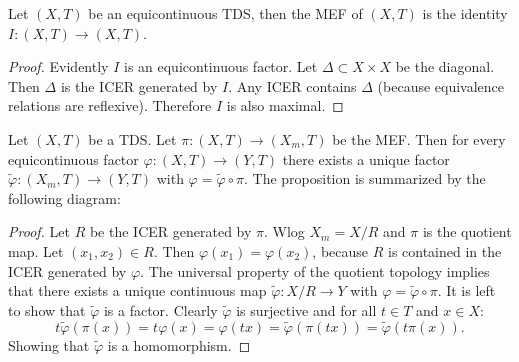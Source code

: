 \begin{proposition}
  Let $(X,T)$ be an equicontinuous TDS, then the MEF of $(X,T)$ is the identity $I: (X,T) \to (X,T)$.
\end{proposition}
\begin{proof}
  Evidently $I$ is an equicontinuous factor.
  Let $\Delta \subset X \times X$ be the diagonal. Then $\Delta$ is the ICER generated by $I$.
  Any ICER contains $\Delta$ (because equivalence relations are reflexive).
  Therefore $I$ is also maximal.
\end{proof}


\begin{proposition}
  Let $(X,T)$ be a TDS. Let $\pi : (X, T) \to  (X_m,T)$ be the MEF.
  Then for every equicontinuous factor $\varphi : (X,T) \to (Y,T)$ there exists a unique factor $\tilde{\varphi}: (X_m,T) \to (Y,T)$ with $\varphi = \tilde{\varphi} \circ \pi$.
  The proposition is summarized by the following diagram:
  \begin{center}
  \end{center}
  \end{proposition}
\begin{proof}
  Let $R$ be the ICER generated by $\pi$.
  Wlog $X_m = X/R$ and $\pi$ is the quotient map.
  Let $(x_1, x_2) \in R$. Then $\varphi (x_1) = \varphi (x_2)$, because $R$ is contained in the ICER generated by $\varphi$.
  The universal property of the quotient topology implies that there exists a unique continuous map $\tilde{\varphi}: X/R \to Y$ with $\varphi = \tilde{\varphi}\circ \pi$.
  It is left to show that $\tilde{\varphi}$ is a factor.
  Clearly $\tilde{\varphi}$ is surjective and for all $t\in T$ and $x \in X$:
  \begin{equation*}
    t \tilde{\varphi} (\pi(x)) =  t \varphi (x) = \varphi (tx) = \tilde{\varphi}(\pi (tx)) = \tilde{\varphi}(t \pi (x)) .
  \end{equation*}
  Showing that $\tilde{\varphi}$ is a homomorphism.
\end{proof}

